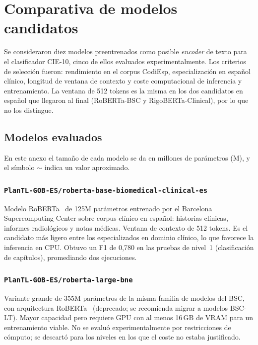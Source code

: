 \chapter{Comparativa de modelos candidatos}
\label{cap:AnexoA}

Se consideraron diez modelos preentrenados como posible \emph{encoder} de texto para el clasificador CIE-10, cinco de ellos evaluados experimentalmente. Los criterios de selección fueron: rendimiento en el corpus CodiEsp, especialización en español clínico, longitud de ventana de contexto y coste computacional de inferencia y entrenamiento. La ventana de 512 tokens es la misma en los dos candidatos en español que llegaron al final (RoBERTa-BSC y RigoBERTa-Clinical), por lo que no los distingue.

\section{Modelos evaluados}

En este anexo el tamaño de cada modelo se da en millones de parámetros (M), y el símbolo $\sim$ indica un valor aproximado.

\subsection{\texttt{PlanTL-GOB-ES/roberta-base-biomedical-clinical-es}}

Modelo RoBERTa~\cite{liu2019roberta} de 125M parámetros entrenado por el Barcelona Supercomputing Center sobre corpus clínico en español: historias clínicas, informes radiológicos y notas médicas. Ventana de contexto de 512 tokens. Es el candidato más ligero entre los especializados en dominio clínico, lo que favorece la inferencia en CPU. Obtuvo un F1 de 0{,}780 en las pruebas de nivel~1 (clasificación de capítulos), promediando dos ejecuciones.

\subsection{\texttt{PlanTL-GOB-ES/roberta-large-bne}}

Variante grande de 355M parámetros de la misma familia de modelos del BSC, con arquitectura RoBERTa~\cite{liu2019roberta} (deprecado; se recomienda migrar a modelos BSC-LT). Mayor capacidad pero requiere GPU con al menos 16\,GB de VRAM para un entrenamiento viable. No se evaluó experimentalmente por restricciones de cómputo; se descartó para los niveles en los que el coste no estaba justificado.

